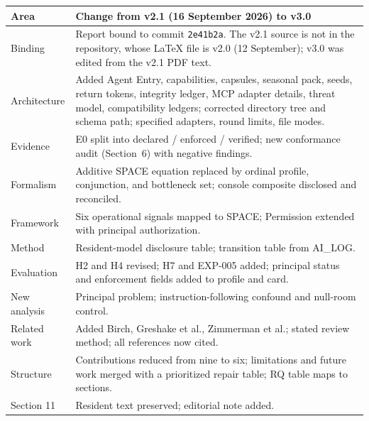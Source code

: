\documentclass{arxiv-neurips-single}
\begin{document}
\begin{table}[H]
\centering\footnotesize
{}
\begin{tabularx}{\textwidth}{@{}l Y@{}}
\toprule
\textbf{Area} & \textbf{Change from v2.1 (16 September 2026) to v3.0} \\
\midrule
Binding & Report bound to commit \texttt{2e41b2a}. The v2.1 source is not in the repository, whose LaTeX file is v2.0 (12 September); v3.0 was edited from the v2.1 PDF text. \\
Architecture & Added Agent Entry, capabilities, capsules, seasonal pack, seeds, return tokens, integrity ledger, MCP adapter details, threat model, compatibility ledgers; corrected directory tree and schema path; specified adapters, round limits, file modes. \\
Evidence & E0 split into declared / enforced / verified; new conformance audit (Section~6) with negative findings. \\
Formalism & Additive SPACE equation replaced by ordinal profile, conjunction, and bottleneck set; console composite disclosed and reconciled. \\
Framework & Six operational signals mapped to SPACE; Permission extended with principal authorization. \\
Method & Resident-model disclosure table; transition table from AI\_LOG. \\
Evaluation & H2 and H4 revised; H7 and EXP-005 added; principal status and enforcement fields added to profile and card. \\
New analysis & Principal problem; instruction-following confound and null-room control. \\
Related work & Added Birch, Greshake et al., Zimmerman et al.; stated review method; all references now cited. \\
Structure & Contributions reduced from nine to six; limitations and future work merged with a prioritized repair table; RQ table maps to sections. \\
Section 11 & Resident text preserved; editorial note added. \\
\bottomrule
\end{tabularx}
\end{table}
\end{document}

